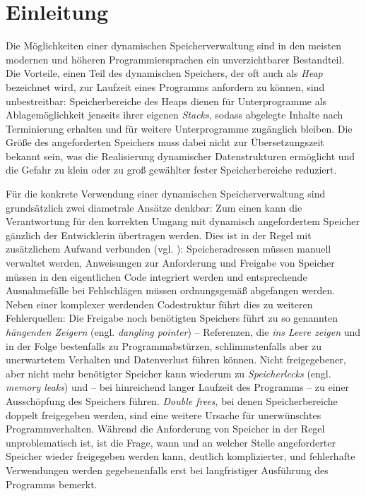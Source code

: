\chapter{Einleitung}
\label{cha:intro}

Die Möglichkeiten einer dynamischen Speicherverwaltung sind in den meisten modernen und höheren Programmiersprachen ein unverzichtbarer Bestandteil.
Die Vorteile, einen Teil des dynamischen Speichers, der oft auch als \textit{Heap} bezeichnet wird, zur Laufzeit eines Programms anfordern zu können, sind unbestreitbar:
Speicherbereiche des Heaps dienen für Unterprogramme als Ablagemöglichkeit jenseits ihrer eigenen \textit{Stacks}, sodass abgelegte Inhalte nach Terminierung erhalten und für weitere Unterprogramme zugänglich bleiben.
Die Größe des angeforderten Speichers muss dabei nicht zur Übersetzungszeit bekannt sein, was die Realisierung dynamischer Datenstrukturen ermöglicht und die Gefahr zu klein oder zu groß gewählter fester Speicherbereiche reduziert.

Für die konkrete Verwendung einer dynamischen Speicherverwaltung sind grundsätzlich zwei diametrale Ansätze denkbar:
Zum einen kann die Verantwortung für den korrekten Umgang mit dynamisch angefordertem Speicher gänzlich der Entwicklerin übertragen werden.
Dies ist in der Regel mit zusätzlichem Aufwand verbunden (vgl. \cite[S. 1f]{wilson1992}):
Speicheradressen müssen manuell verwaltet werden, Anweisungen zur Anforderung und Freigabe von Speicher müssen in den eigentlichen Code integriert werden und entsprechende Ausnahmefälle bei Fehlschlägen müssen ordnungsgemäß abgefangen werden.
Neben einer komplexer werdenden Codestruktur führt dies zu weiteren Fehlerquellen:
Die Freigabe noch benötigten Speichers führt zu so genannten \textit{hängenden Zeigern} (engl. \textit{dangling pointer}) -- Referenzen, die \textit{ins Leere zeigen} und in der Folge bestenfalls zu Programmabstürzen, schlimmstenfalls aber zu unerwartetem Verhalten und Datenverlust führen können.
Nicht freigegebener, aber nicht mehr benötigter Speicher kann wiederum zu \textit{Speicherlecks} (engl. \textit{memory leaks}) und -- bei hinreichend langer Laufzeit des Programms -- zu einer Ausschöpfung des Speichers führen.
\textit{Double frees}, bei denen Speicherbereiche doppelt freigegeben werden, sind eine weitere Ursache für unerwünschtes Programmverhalten.
Während die Anforderung von Speicher in der Regel unproblematisch ist, ist die Frage, wann und an welcher Stelle angeforderter Speicher wieder freigegeben werden kann, deutlich komplizierter, und fehlerhafte Verwendungen werden gegebenenfalls erst bei langfristiger Ausführung des Programms bemerkt.

